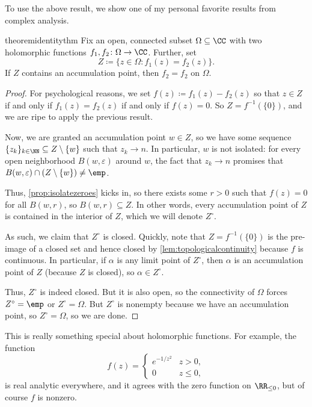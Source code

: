 \documentclass[../notes.tex]{subfiles}
\begin{document}
To use the above result, we show one of my personal favorite results from complex analysis.
\begin{restatable}[Identity]{theorem}{identitythm} \label{thm:id}
	Fix an open, connected subset $\Omega\subseteq\CC$ with two holomorphic functions $f_1,f_2\colon\Omega \to\CC$. Further, set
	\[Z\coloneqq \{z\in\Omega:f_1(z)=f_2(z)\}.\]
	If $Z$ contains an accumulation point, then $f_2=f_2$ on $\Omega$.
\end{restatable}
\begin{proof}
	For psychological reasons, we set $f(z)\coloneqq f_1(z)-f_2(z)$ so that $z\in Z$ if and only if $f_1(z)=f_2(z)$ if and only if $f(z)=0$. So $Z=f^{-1}(\{0\})$, and we are ripe to apply the previous result.

	Now, we are granted an accumulation point $w\in Z$, so we have some sequence $\{z_k\}_{k\in\NN}\subseteq Z\setminus\{w\}$ such that $z_k\to n$. In particular, $w$ is not isolated: for every open neighborhood $B(w,\varepsilon)$ around $w$, the fact that $z_k\to n$ promises that $B(w,\varepsilon)\cap(Z\setminus\{w\})\ne\emp$.

	Thus, \autoref{prop:isolatezeroes} kicks in, so there exists some $r>0$ such that $f(z)=0$ for all $B(w,r)$, so $B(w,r)\subseteq Z$. In other words, every accumulation point of $Z$ is contained in the interior of $Z$, which we will denote $Z^\circ$.

	As such, we claim that $Z^\circ$ is closed. Quickly, note that $Z=f^{-1}(\{0\})$ is the pre-image of a closed set and hence closed by \autoref{lem:topologicalcontinuity} because $f$ is continuous.
	In particular, if $\alpha$ is any limit point of $Z^\circ$, then $\alpha$ is an accumulation point of $Z$ (because $Z$ is closed), so $\alpha\in Z^\circ$.

	Thus, $Z^\circ$ is indeed closed. But it is also open, so the connectivity of $\Omega$ forces $Z^\circ=\emp$ or $Z^\circ=\Omega$. But $Z^\circ$ is nonempty because we have an accumulation point, so $Z^\circ=\Omega$, so we are done.
\end{proof}
\begin{remark}
	This is really something special about holomorphic functions. For example, the function
	\[f(z)=\begin{cases}
		e^{-1/z^2} & z>0, \\
		0 & z\le0,
	\end{cases}\]
	is real analytic everywhere, and it agrees with the zero function on $\RR_{\le0}$, but of course $f$ is nonzero.
\end{remark}
\end{document}

